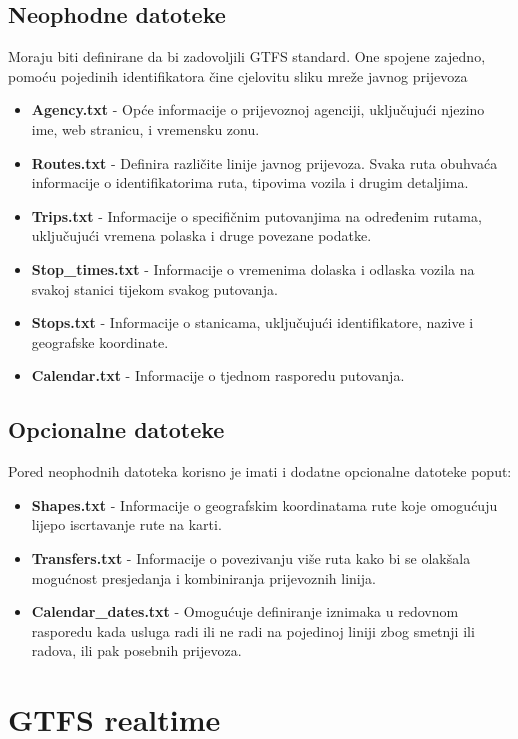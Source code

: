 \documentclass[zavrsnirad]{fer}
\begin{document}
\newpage

\subsection{Neophodne datoteke}
Moraju biti definirane da bi zadovoljili GTFS standard. One spojene zajedno, pomoću pojedinih identifikatora čine cjelovitu sliku mreže javnog prijevoza
\begin{itemize}
	\item \textbf{Agency.txt} -
	Opće informacije o prijevoznoj agenciji, uključujući njezino ime, web stranicu, i vremensku zonu.
	\item \textbf{Routes.txt} -
	Definira različite linije javnog prijevoza. Svaka ruta obuhvaća informacije o identifikatorima ruta, tipovima vozila i drugim detaljima.
	\item \textbf{Trips.txt} -
	Informacije o specifičnim putovanjima na određenim rutama, uključujući vremena polaska i druge povezane podatke.
	\item \textbf{Stop\_times.txt} -
	Informacije o vremenima dolaska i odlaska vozila na svakoj stanici tijekom svakog putovanja.
	\item \textbf{Stops.txt} -
	Informacije o stanicama, uključujući identifikatore, nazive i geografske koordinate.
	\item \textbf{Calendar.txt} -
	Informacije o tjednom rasporedu putovanja.
\end{itemize}

\subsection{Opcionalne datoteke}
Pored neophodnih datoteka korisno je imati i dodatne opcionalne datoteke poput:
\begin{itemize}
	\item \textbf{Shapes.txt} -
	Informacije o geografskim koordinatama rute koje omogućuju lijepo iscrtavanje rute na karti.
	\item \textbf{Transfers.txt} -
	Informacije o povezivanju više ruta kako bi se olakšala mogućnost presjedanja i kombiniranja prijevoznih linija.
	\item \textbf{Calendar\_dates.txt} -
	Omogućuje definiranje iznimaka u redovnom rasporedu kada usluga radi ili ne radi na pojedinoj liniji zbog smetnji ili radova, ili pak posebnih prijevoza.
\end{itemize}

\section[GTFS-rt]{GTFS realtime}
\end{document}
